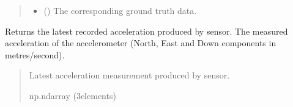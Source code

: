 \documentclass[letterpaper,10pt,english]{sphinxmanual}
\begin{document}
\begin{fulllineitems}
\begin{fulllineitems}
\begin{quote}
\begin{description}
\begin{itemize}
\item {} 
\sphinxAtStartPar
{} ({\hyperref[\detokenize{modules/waypoints/trajectory:qnav.waypoints.trajectory.GroundTruth}]{}}) \textendash{} The corresponding ground truth data.

\end{itemize}

\end{description}\end{quote}

\end{fulllineitems}


\begin{fulllineitems}
\label{\detokenize{modules/measurement/accelerometer:qnav.measurement.accelerometer.Accelerometer.last_measurement}}
\pysigstartsignatures
{}
\pysigstopsignatures
\sphinxAtStartPar
Returns the latest recorded acceleration produced by sensor.
The measured acceleration of the accelerometer (North, East
and Down components in metres/second).
\begin{quote}\begin{description}
\sphinxAtStartPar
Latest acceleration measurement produced by sensor.

\sphinxAtStartPar
np.ndarray (3\sphinxhyphen{}elements)

\end{description}\end{quote}

\end{fulllineitems}



\end{fulllineitems}
\end{document}
